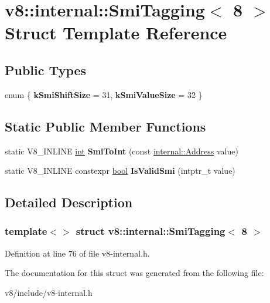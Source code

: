 \hypertarget{structv8_1_1internal_1_1SmiTagging_3_018_01_4}{}\section{v8\+:\+:internal\+:\+:Smi\+Tagging$<$ 8 $>$ Struct Template Reference}
\label{structv8_1_1internal_1_1SmiTagging_3_018_01_4}
\subsection*{Public Types}
\begin{DoxyCompactItemize}
\item 
\mbox{\label{structv8_1_1internal_1_1SmiTagging_3_018_01_4_aec48ea556ba2a9534a5ed83443a53764}} 
enum \{ {\bfseries k\+Smi\+Shift\+Size} = 31, 
{\bfseries k\+Smi\+Value\+Size} = 32
 \}
\end{DoxyCompactItemize}
\subsection*{Static Public Member Functions}
\begin{DoxyCompactItemize}
\item 
\mbox{\label{structv8_1_1internal_1_1SmiTagging_3_018_01_4_a3d0223bc60d1cc83f7931b298bedb335}} 
static V8\+\_\+\+I\+N\+L\+I\+NE \mbox{\hyperlink{classint}{int}} {\bfseries Smi\+To\+Int} (const \mbox{\hyperlink{classuintptr__t}{internal\+::\+Address}} value)
\item 
\mbox{\label{structv8_1_1internal_1_1SmiTagging_3_018_01_4_aba20851b9b3a19360435f2afb05d4aaf}} 
static V8\+\_\+\+I\+N\+L\+I\+NE constexpr \mbox{\hyperlink{classbool}{bool}} {\bfseries Is\+Valid\+Smi} (intptr\+\_\+t value)
\end{DoxyCompactItemize}


\subsection{Detailed Description}
\subsubsection*{template$<$$>$\newline
struct v8\+::internal\+::\+Smi\+Tagging$<$ 8 $>$}



Definition at line 76 of file v8-\/internal.\+h.



The documentation for this struct was generated from the following file\+:\begin{DoxyCompactItemize}
\item 
v8/include/v8-\/internal.\+h\end{DoxyCompactItemize}
